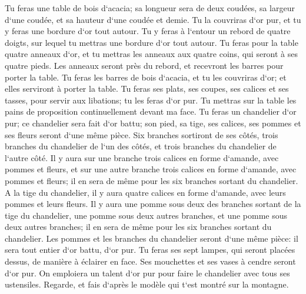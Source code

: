 \verse Tu feras une table de bois d`acacia; sa longueur sera de deux coudées, sa largeur d`une coudée, et sa hauteur d`une coudée et demie. 
\verse Tu la couvriras d`or pur, et tu y feras une bordure d`or tout autour. 
\verse Tu y feras à l`entour un rebord de quatre doigts, sur lequel tu mettras une bordure d`or tout autour. 
\verse Tu feras pour la table quatre anneaux d`or, et tu mettras les anneaux aux quatre coins, qui seront à ses quatre pieds. 
\verse Les anneaux seront près du rebord, et recevront les barres pour porter la table. 
\verse Tu feras les barres de bois d`acacia, et tu les couvriras d`or; et elles serviront à porter la table. 
\verse Tu feras ses plats, ses coupes, ses calices et ses tasses, pour servir aux libations; tu les feras d`or pur. 
\verse Tu mettras sur la table les pains de proposition continuellement devant ma face. 
\verse Tu feras un chandelier d`or pur; ce chandelier sera fait d`or battu; son pied, sa tige, ses calices, ses pommes et ses fleurs seront d`une même pièce. 
\verse Six branches sortiront de ses côtés, trois branches du chandelier de l`un des côtés, et trois branches du chandelier de l`autre côté. 
\verse Il y aura sur une branche trois calices en forme d`amande, avec pommes et fleurs, et sur une autre branche trois calices en forme d`amande, avec pommes et fleurs; il en sera de même pour les six branches sortant du chandelier. 
\verse A la tige du chandelier, il y aura quatre calices en forme d`amande, avec leurs pommes et leurs fleurs. 
\verse Il y aura une pomme sous deux des branches sortant de la tige du chandelier, une pomme sous deux autres branches, et une pomme sous deux autres branches; il en sera de même pour les six branches sortant du chandelier. 
\verse Les pommes et les branches du chandelier seront d`une même pièce: il sera tout entier d`or battu, d`or pur. 
\verse Tu feras ses sept lampes, qui seront placées dessus, de manière à éclairer en face. 
\verse Ses mouchettes et ses vases à cendre seront d`or pur. 
\verse On emploiera un talent d`or pur pour faire le chandelier avec tous ses ustensiles. 
\verse Regarde, et fais d`après le modèle qui t`est montré sur la montagne. 

